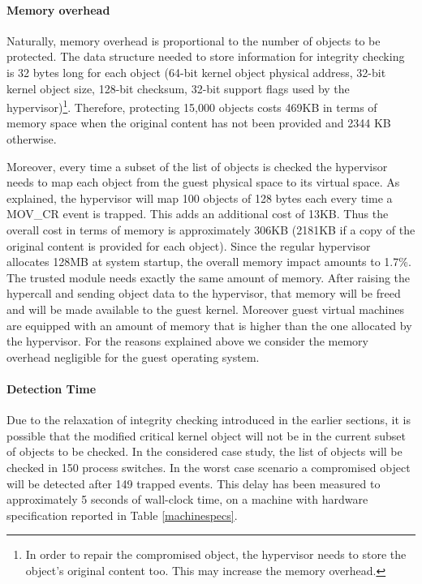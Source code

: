 \newpage



\paragraph{Memory overhead} \label{memory}
Naturally, memory overhead is proportional to the number of objects to be protected. The data structure needed to store information for integrity checking is 32 bytes long for each object (64-bit kernel object physical address, 32-bit kernel object size, 128-bit checksum, 32-bit support flags used by the hypervisor)\footnote{In order to repair the compromised object, the hypervisor needs to store the object's original content too. This may increase the memory overhead.}.  
Therefore, protecting 15,000 objects costs 469KB in terms of memory space when the original content has not been provided and 2344 KB otherwise. 

Moreover, every time a subset of the list of objects is checked the hypervisor needs to map each object from the guest physical space to its virtual space. As explained, the hypervisor will map 100 objects of 128 bytes each every time a MOV\_CR event is trapped. This adds an additional cost of 13KB. Thus the overall cost in terms of memory is approximately 306KB (2181KB if a copy of the original content is provided for each object). 
Since the regular hypervisor allocates 128MB at system startup, the overall memory impact amounts to 1.7\%. 
The trusted module needs exactly the same amount of memory. After raising the hypercall and sending object data to the hypervisor, that memory will be freed and will be made available to the guest kernel. 
Moreover guest virtual machines are equipped with an amount of memory that is higher than the one allocated by the hypervisor. For the reasons explained above we consider the memory overhead negligible for the guest operating system.
 

\paragraph{Detection Time}
Due to the relaxation of integrity checking introduced in the earlier sections, it is possible that the modified critical kernel object will not be in the current subset of objects to be checked. In the considered case study, the list of objects will be checked in 150 process switches. In the worst case scenario a compromised object will be detected after 149 trapped events. This delay has been measured to approximately 5 seconds of wall-clock time, on a machine with hardware specification reported in Table \ref{machinespecs}. 

